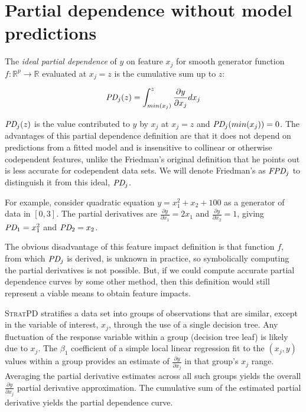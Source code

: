 \documentclass{article}
\newcommand{\spd}{\fontfamily{cmr}\textsc{\small StratPD}}
\begin{document}
\section{Partial dependence without model predictions}

 The {\em ideal partial dependence} of $y$ on feature $x_j$ for smooth generator function $f:\mathbb{R}^{p} \rightarrow \mathbb{R}$ evaluated at $x_j = z$ is the cumulative sum up to $z$:

\begin{equation}\label{eq:pd}
\text{\it PD}_j(z) = \int_{min(x_j)}^z \frac{\partial y}{\partial x_j} dx_j
\end{equation}

$\text{\it PD}_j(z)$ is the value contributed to $y$ by $x_j$ at $x_j = z$ and $\text{\it PD}_j(min(x_j))=0$. The advantages of this partial dependence definition are that it does not depend on predictions from a fitted model and is insensitive to collinear or otherwise codependent features, unlike the Friedman's original definition that he points out is less accurate for codependent data sets. We will denote Friedman's as $\text{\it FPD}_j$ to distinguish it from this ideal, $\text{\it PD}_j$.

For example, consider quadratic equation $y = x_1^2 + x_2 + 100$ as a generator of data in $[0,3]$. The partial derivatives are $\frac{\partial y}{\partial x_1} = 2 x_1$ and $\frac{\partial y}{\partial x_2} = 1$, giving $\text{\it PD}_1 = x_1^2$ and $\text{\it PD}_2 = x_2$. 

The obvious disadvantage of this feature impact definition is that function $f$, from which $\text{\it PD}_j$ is derived, is unknown in practice, so symbolically computing the partial derivatives is not possible. But, if we could compute accurate partial dependence curves by some other method, then this definition would still represent a viable means to obtain feature impacts. 

\spd{} stratifies a data set into groups of observations that are similar, except in the variable of interest, $x_j$, through the use of a single decision tree. Any fluctuation of the response variable within a group (decision tree leaf) is likely due to $x_j$.  The $\beta_1$ coefficient of a simple local linear regression fit to the $(x_j, y)$ values within a group provides an estimate of $\frac{\partial y}{\partial x_j}$ in that group's $x_j$ range. Averaging the partial derivative estimates across all such groups yields the overall $\frac{\partial y}{\partial x_j}$ partial derivative approximation. The cumulative sum of the estimated partial derivative yields the partial dependence curve. 
\end{document}
